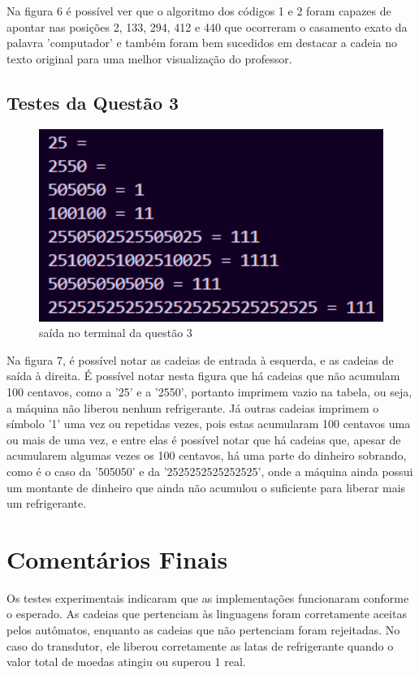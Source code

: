 \documentclass[12pt]{article}
\begin{document}
Na figura 6 é possível ver que o algoritmo dos códigos 1 e 2 foram capazes de  apontar nas posições 2, 133, 294, 412 e 440 que ocorreram o casamento exato da palavra 'computador' e também foram bem sucedidos em destacar a cadeia no texto original para uma melhor visualização do professor.

\subsection{Testes da Questão 3}

\begin{figure}[H]
\centering
\includegraphics[width=1\textwidth]{images/testes questao 3.pdf} 
\caption{saída no terminal da questão 3}
\label{fig:regexExplanation}
\end{figure}

Na figura 7, é possível notar as cadeias de entrada à esquerda, e as cadeias de saída à direita. É possível notar nesta figura que há cadeias que não acumulam 100 centavos, como a '25' e a '2550', portanto imprimem vazio na tabela, ou seja, a máquina não liberou nenhum refrigerante. Já outras cadeias imprimem o símbolo '1' uma vez ou repetidas vezes, pois estas acumularam 100 centavos uma ou mais de uma vez, e entre elas é possível notar que há cadeias que, apesar de acumularem algumas vezes os 100 centavos, há uma parte do dinheiro sobrando, como é o caso da '505050' e da '2525252525252525', onde a máquina ainda possui um montante de dinheiro que ainda não acumulou o suficiente para liberar mais um refrigerante.

\section{\textbf{Comentários Finais}}

Os testes experimentais indicaram que as implementações funcionaram conforme o esperado. As cadeias que pertenciam às linguagens foram corretamente aceitas pelos autômatos, enquanto as cadeias que não pertenciam foram rejeitadas. No caso do transdutor, ele liberou corretamente as latas de refrigerante quando o valor total de moedas atingiu ou superou 1 real.
\end{document}
